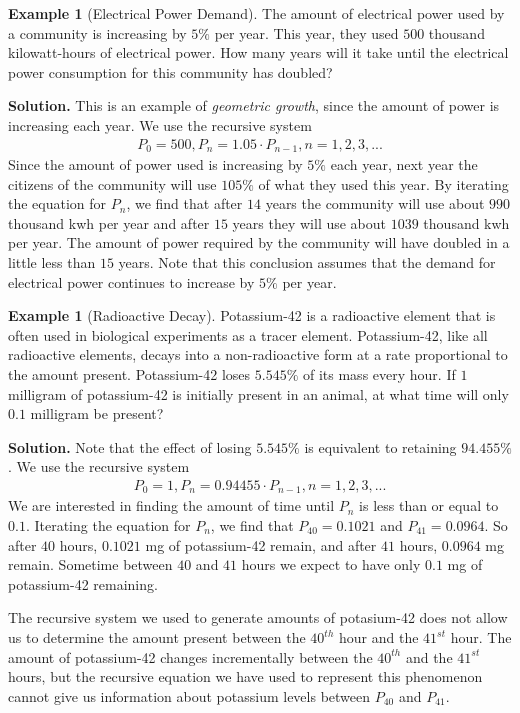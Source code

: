 \documentclass[10pt,]{book}
\theoremstyle{plain}
\theoremstyle{definition}
\theoremstyle{definition}
\newtheorem{example}[theorem]{Example}
\theoremstyle{definition}
\numberwithin{equation}{section}
\begin{document}
\begin{example}[Electrical Power Demand]\label{example-electrical-power-demand}
\hypertarget{p-73}{}%
The amount of electrical power used by a community is increasing by \(5\%\) per year.  This year, they used \(500\) thousand kilowatt-hours of electrical power.  How many years will it take until the electrical power consumption for this community has doubled?%
\par\smallskip%
\noindent\textbf{Solution.}\hypertarget{solution-5}{}\quad%
\hypertarget{p-74}{}%
This is an example of \emph{geometric growth}, since the amount of power is increasing each year. We use the recursive system%
%
\begin{gather*}
P_0=500, P_n=1.05 \cdot P_{n-1}, n=1,2,3,...
\end{gather*}
\hypertarget{p-75}{}%
Since the amount of power used is increasing by \(5\%\) each year, next year the citizens of the community will use \(105\%\) of what they used this year.  By iterating the equation for \(P_n\), we find that after \(14\) years the community will use about \(990\) thousand kwh per year and after \(15\) years they will use about \(1039\) thousand kwh per year.  The amount of power required by the community will have doubled in a little less than \(15\) years.  Note that this conclusion assumes that the demand for electrical power continues to increase by \(5\%\) per year.%
\end{example}
\begin{example}[Radioactive Decay]\label{example-radioactive-decay}
\hypertarget{p-76}{}%
Potassium-42 is a radioactive element that is often used in biological experiments as a tracer element.  Potassium-42, like all radioactive elements, decays into a non-radioactive form at a rate proportional to the amount present.  Potassium-42 loses \(5.545\%\) of its mass every hour.  If \(1\) milligram of potassium-42 is initially present in an animal, at what time will only \(0.1\) milligram be present?%
\par\smallskip%
\noindent\textbf{Solution.}\hypertarget{solution-6}{}\quad%
\hypertarget{p-77}{}%
Note that the effect of losing \(5.545\%\) is equivalent to retaining \(94.455\%\). We use the recursive system%
%
\begin{gather*}
P_0=1, P_n=0.94455 \cdot P_{n-1}, n=1,2,3,...
\end{gather*}
\hypertarget{p-78}{}%
We are interested in finding the amount of time until \(P_n\) is less than or equal to \(0.1\).  Iterating the equation for \(P_n\), we find that \(P_{40} = 0.1021\) and \(P_{41} = 0.0964\). So after \(40\) hours, \(0.1021\) mg of potassium-42 remain, and after \(41\) hours, \(0.0964\) mg remain. Sometime between \(40\) and \(41\) hours we expect to have only \(0.1\) mg of potassium-42 remaining.%
\par
\hypertarget{p-79}{}%
The recursive system we used to generate amounts of potasium-42 does not allow us to determine the amount present between the \(40^{th}\) hour and the \(41^{st}\) hour.  The amount of potassium-42 changes incrementally between the \(40^{th}\) and the \(41^{st}\) hours, but the recursive equation we have used to represent this phenomenon cannot give us information about potassium levels between \(P_{40}\) and \(P_{41}\).%
\end{example}
\end{document}
